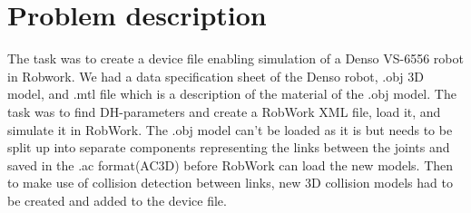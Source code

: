 \section{Problem description}
\label{sec:description}

The task was to create a device file enabling simulation of a Denso VS-6556 robot in Robwork. We had a data specification sheet of the Denso robot, .obj 3D model, and .mtl file which is a description of the material of the .obj model. The task was to find DH-parameters and create a RobWork XML file, load it, and simulate it in RobWork. The .obj model can't be loaded as it is but needs to be split up into separate components representing the links between the joints and saved in the .ac format(AC3D) before RobWork can load the new models. Then to make use of collision detection between links, new 3D collision models had to be created and added to the device file.
